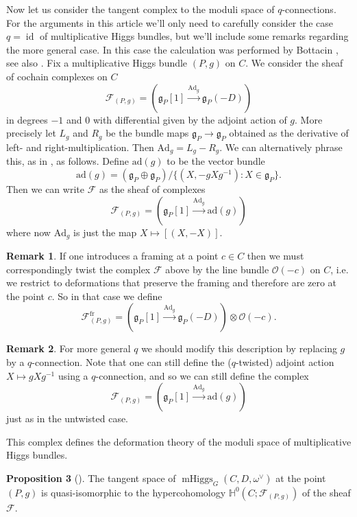 \documentclass[11pt, oneside, reqno]{amsart}
\theoremstyle{definition} \newtheorem{definition}{Definition}[section]
\newtheorem{prop}[definition]{Proposition}
\theoremstyle{definition} \newtheorem{remark}[definition]{Remark}
\theoremstyle{definition} \newtheorem{remarks}[definition]{Remarks}
\theoremstyle{definition} \newtheorem{question}[definition]{Question}
\theoremstyle{definition} \newtheorem*{note}{Note}
\theoremstyle{definition} \newtheorem{example}[definition]{Example}
\theoremstyle{definition} \newtheorem{examples}[definition]{Examples}
\renewcommand{\gg}{\mathfrak{g}}
\newcommand{\bb}[1]{\mathbb{#1}}
\newcommand{\mr}[1]{\mathrm{#1}}
\newcommand{\mc}[1]{\mathcal{#1}}
\newcommand{\OO}{\mathcal{O}}
\DeclareMathOperator{\id}{id}
\DeclareMathOperator{\mhiggs}{mHiggs}
\newcommand{\fr}{\mathrm{fr}}
\newcommand{\ad}{\mr{ad}}
\newcommand{\Ad}{\mr{Ad}}
\begin{document}
Now let us consider the tangent complex to the moduli space of $q$-connections.  For the arguments in this article we'll only need to carefully consider the case $q=\id$ of multiplicative Higgs bundles, but we'll include some remarks regarding the more general case.  In this case the calculation was performed by Bottacin \cite{Bottacin}, see also \cite[Section 4]{HurtubiseMarkman}. Fix a multiplicative Higgs bundle $(P,g)$ on $C$.  We consider the sheaf of cochain complexes on $C$
\[\mc F_{(P,g)} = (\gg_P[1] \overset {\Ad_g} {\to} \gg_P(-D))\]
in degrees $-1$ and 0 with differential given by the adjoint action of $g$.  More precisely let $L_g$ and $R_g$ be the bundle maps $\gg_P \to \gg_P$ obtained as the derivative of left- and right-multiplication.  Then $\Ad_g = L_g - R_g$.  We can alternatively phrase this, as in \cite[Section 4]{HurtubiseMarkman}, as follows.  Define $\ad(g)$ to be the vector bundle
\[\ad(g) = (\gg_P \oplus \gg_P)/\{(X, -g X g^{-1}): X \in \gg_P\}.\]
Then we can write $\mc F$ as the sheaf of complexes
\[\mc F_{(P,g)} = (\gg_P[1] \overset {\Ad_g} {\to} \ad(g))\]
where now $\Ad_g$ is just the map $X \mapsto [(X,-X)]$.

\begin{remark}
  If one introduces a framing at a point $c \in C$ then we must correspondingly twist the complex $\mc F$ above by the line bundle $\OO(-c)$ on $C$, i.e. we restrict to deformations that preserve the framing and therefore are zero at the point $c$.  So in that case we define
\[\mc F^\fr_{(P,g)} = (\gg_P[1] \overset {\Ad_g} {\to} \gg_P(-D)) \otimes \OO(-c).\]
\end{remark}

\begin{remark}
For more general $q$ we should modify this description by replacing $g$ by a $q$-connection.  Note that one can still define the ($q$-twisted) adjoint action $X \mapsto g X g^{-1}$ using a $q$-connection, and so we can still define the complex
\[\mc F_{(P,g)} = (\gg_P[1] \overset {\Ad_g} {\to} \ad(g))\]
just as in the untwisted case.
\end{remark}

This complex defines the deformation theory of the moduli space of multiplicative Higgs bundles.

\begin{prop}[{\cite[Proposition 3.1.3]{Bottacin}}]
The tangent space of $\mhiggs_G(C, D, \omega^\vee)$ at the point $(P,g)$ is quasi-isomorphic to the hypercohomology $\bb H^0(C; \mc F_{(P,g)})$ of the sheaf $\mc F$.
\end{prop}
\end{document}
